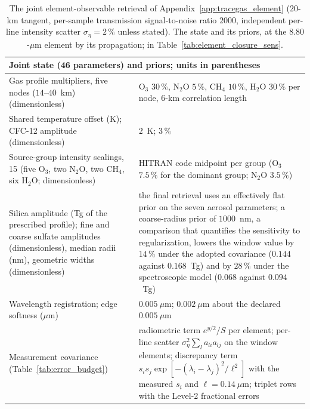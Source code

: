 \begin{table}[t]
\centering
\caption{The joint element-observable retrieval of Appendix~\ref{app:tracegas_element} ($20$-km tangent, per-sample transmission signal-to-noise ratio $2000$, independent per-line intensity scatter $\sigma_\eta=2\,\%$ unless stated). The state and its priors,  at the $8.80$-$\mu$m element by its propagation;  in Table~\ref{tab:element_closure_sens}.}
\label{tab:element_closure}
\footnotesize
\begin{tabular}{p{6.4cm}p{10.2cm}}
\toprule
\multicolumn{2}{l}{Joint state (46 parameters) and priors; units in parentheses} \\
\midrule
Gas profile multipliers, five nodes ($14$--$40$~km) (dimensionless) & O$_3$ $30\,\%$, N$_2$O $5\,\%$, CH$_4$ $10\,\%$, H$_2$O $30\,\%$ per node, $6$-km correlation length \\
Shared temperature offset (K); CFC-12 amplitude (dimensionless) & $2$~K; $3\,\%$ \\
Source-group intensity scalings, 15 (five O$_3$, two N$_2$O, two CH$_4$, six H$_2$O; dimensionless) & HITRAN code midpoint per group (O$_3$ $7.5\,\%$ for the dominant group; N$_2$O $3.5\,\%$) \\
Silica amplitude (Tg of the prescribed profile); fine and coarse sulfate amplitudes (dimensionless), median radii (nm), geometric widths (dimensionless) & the final retrieval uses an effectively flat prior on the seven aerosol parameters; a coarse-radius prior of $1000$~nm, a comparison that quantifies the sensitivity to regularization, lowers the window value by $14\,\%$ under the adopted covariance ($0.144$ against $0.168$~Tg) and by $28\,\%$ under the spectroscopic model ($0.068$ against $0.094$~Tg) \\
Wavelength registration; edge softness ($\mu$m) & $0.005~\mu$m; $0.002~\mu$m about the declared $0.005~\mu$m \\
Measurement covariance (Table~\ref{tab:error_budget}) & radiometric term $e^{y/2}/S$ per element; per-line scatter $\sigma_\eta^{2}\sum_l a_{li}a_{lj}$ on the window elements; discrepancy term $s_i s_j\exp[-(\lambda_i-\lambda_j)^2/\ell^2]$ with the measured $s_i$ and $\ell=0.14~\mu$m; triplet rows with the Level-2 fractional errors \\

\end{tabular}
\end{table}
